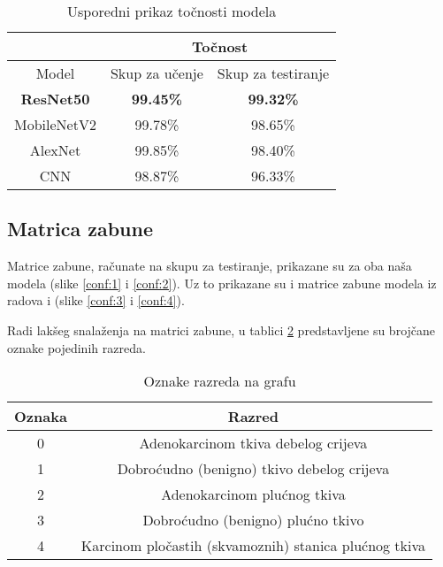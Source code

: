 \documentclass[conference, utf8]{IEEEtran}
\begin{document}
	\begin{table}[H]
		\centering
		\caption{Usporedni prikaz točnosti modela}
		\label{table:1}
		\begin{tabular}{ |c|c|c| } 
			\hline
			& \multicolumn{2}{c|}{Točnost} \\
			\hline
			Model & Skup za učenje  & Skup za testiranje \\
			\hline \hline
			\textbf{ResNet50} & \textbf{99.45\%}  & \textbf{99.32\%}  \\
			\hline
			MobileNetV2 & 99.78\%  & 98.65\%  \\
			\hline
			AlexNet\cite{RAD1} & 99.85\%  & 98.40\%  \\
			\hline
			CNN\cite{RAD2} & 98.87\% & 96.33\%  \\
			\hline
		\end{tabular}
	\end{table}
	
	\subsection{Matrica zabune}
	Matrice zabune, računate na skupu za testiranje, prikazane su za oba naša modela (slike \ref{conf:1} i \ref{conf:2}). Uz to prikazane su i matrice zabune modela iz radova \cite{RAD1} i \cite{RAD2} (slike \ref{conf:3} i \ref{conf:4}).
	
	Radi lakšeg snalaženja na matrici zabune, u tablici \ref{table:3} predstavljene su brojčane oznake pojedinih razreda.
	
	\begin{table}[H]
		\centering
		\caption{Oznake razreda na grafu}
		\label{table:3}
		\begin{tabular}{ |c|c| } 
			\hline
			Oznaka & Razred \\
			\hline \hline
			0 & Adenokarcinom tkiva debelog crijeva \\
			\hline
			1 & Dobroćudno (benigno) tkivo debelog crijeva \\
			\hline
			2 & Adenokarcinom plućnog tkiva \\
			\hline
			3 & Dobroćudno (benigno) plućno tkivo \\
			\hline
			4 & Karcinom pločastih (skvamoznih) stanica plućnog tkiva \\
			\hline
		\end{tabular}
	\end{table}
	
\end{document}
